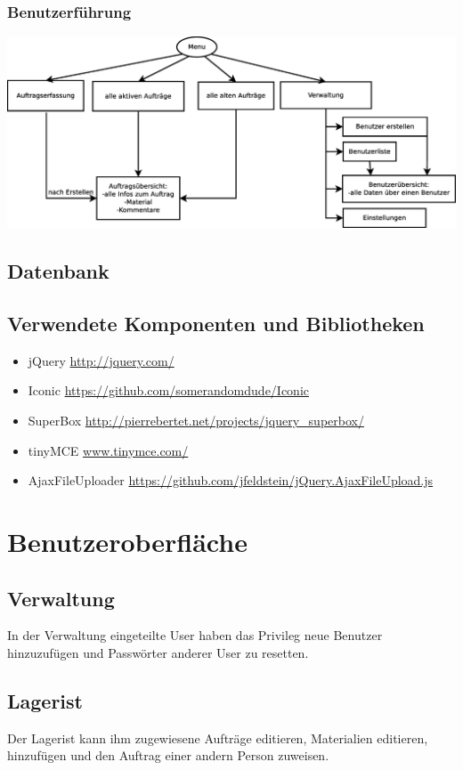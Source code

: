 \documentclass[ngerman, 12pt, pdftex]{scrartcl}[2006/07/30]
\begin{document}
	\subsubsection{Benutzerführung}
 \includegraphics[width=\textwidth]{navigation.eps}

\subsection{Datenbank}


\subsection{Verwendete Komponenten und Bibliotheken} %
\begin{itemize}
\item jQuery \url{http://jquery.com/}
\item Iconic \url{https://github.com/somerandomdude/Iconic}
\item SuperBox \url{http://pierrebertet.net/projects/jquery_superbox/}
\item tinyMCE \url{www.tinymce.com/}
\item AjaxFileUploader \url{https://github.com/jfeldstein/jQuery.AjaxFileUpload.js}
\end{itemize}



\section{Benutzeroberfläche}
\subsection{Verwaltung}
In der Verwaltung eingeteilte User haben das Privileg neue Benutzer hinzuzufügen und Passwörter anderer User zu resetten.
\subsection{Lagerist}
Der Lagerist kann ihm zugewiesene Aufträge editieren, Materialien editieren, hinzufügen und den Auftrag einer andern Person zuweisen.
\end{document}
